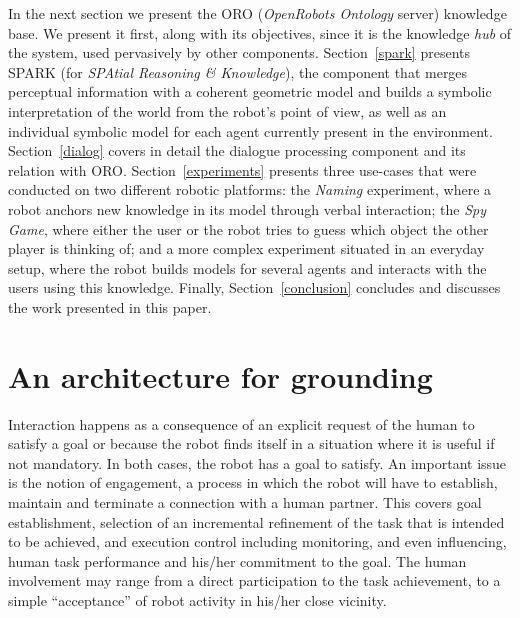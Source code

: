 \documentclass{svmult}
\begin{document}
In the next section we present the {\sc ORO}
(\emph{OpenRobots Ontology} server) knowledge base. We present it first, along with its objectives,
since it is the knowledge \textit{hub} of the system, used pervasively by other
components.
Section~\ref{spark} presents {\sc SPARK} (for \emph{SPAtial Reasoning \& Knowledge}), the
component that merges perceptual information with a coherent geometric model and
builds a symbolic interpretation of the world from the robot's point of view,
as well as an individual symbolic model for each agent currently present in the
environment. 
Section~\ref{dialog} covers in detail the dialogue processing component and its 
relation with ORO.
Section~\ref{experiments} presents three use-cases that were conducted on two 
different robotic platforms: the \emph{Naming} experiment, where a robot anchors new
knowledge in its model through verbal interaction; the \emph{Spy Game}, where
either the user or the robot tries to guess which object the other player is
thinking of; and a more complex experiment situated in an everyday setup, where
the robot builds models for several agents and interacts with the users using
this knowledge. 
Finally, Section~\ref{conclusion} concludes and discusses the work presented 
in this paper.







\section{An architecture for grounding}
\label{sec:Framework}

Interaction happens as a consequence of an explicit request of the
human to satisfy a goal or because the robot finds itself in a
situation where it is useful if not mandatory. In both cases, the
robot has a goal to satisfy.  An important issue is the notion of
engagement, a process in which the robot will have to establish,
maintain and terminate a connection with a human partner. 
This covers goal establishment, selection of an incremental refinement
of the task that is intended to be achieved, and execution control
including monitoring, and even influencing, human task performance and
his/her commitment to the goal. The human involvement may range from a
direct participation to the task achievement, to a simple
``acceptance'' of robot activity in his/her close vicinity.
  
\end{document}
